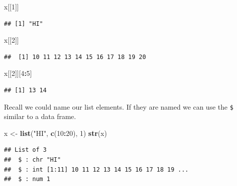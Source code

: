 \documentclass[
]{book}
\newenvironment{Shaded}{\begin{snugshade}}{\end{snugshade}}
\newcommand{\DataTypeTok}[1]{\textcolor[rgb]{0.13,0.29,0.53}{#1}}
\newcommand{\DecValTok}[1]{\textcolor[rgb]{0.00,0.00,0.81}{#1}}
\newcommand{\KeywordTok}[1]{\textcolor[rgb]{0.13,0.29,0.53}{\textbf{#1}}}
\newcommand{\NormalTok}[1]{#1}
\newcommand{\OperatorTok}[1]{\textcolor[rgb]{0.81,0.36,0.00}{\textbf{#1}}}
\newcommand{\StringTok}[1]{\textcolor[rgb]{0.31,0.60,0.02}{#1}}
\theoremstyle{definition}
\theoremstyle{definition}
\theoremstyle{definition}
\theoremstyle{remark}
\begin{document}
\begin{Shaded}
\begin{Highlighting}[]
\NormalTok{x[[}\DecValTok{1}\NormalTok{]]}
\end{Highlighting}
\end{Shaded}

\begin{verbatim}
## [1] "HI"
\end{verbatim}

\begin{Shaded}
\begin{Highlighting}[]
\NormalTok{x[[}\DecValTok{2}\NormalTok{]]}
\end{Highlighting}
\end{Shaded}

\begin{verbatim}
##  [1] 10 11 12 13 14 15 16 17 18 19 20
\end{verbatim}

\begin{Shaded}
\begin{Highlighting}[]
\NormalTok{x[[}\DecValTok{2}\NormalTok{]][}\DecValTok{4}\OperatorTok{:}\DecValTok{5}\NormalTok{]}
\end{Highlighting}
\end{Shaded}

\begin{verbatim}
## [1] 13 14
\end{verbatim}

Recall we could name our list elements. If they are named we can use the \texttt{\$} similar to a data frame.

\begin{Shaded}
\begin{Highlighting}[]
\NormalTok{x <-}\StringTok{ }\KeywordTok{list}\NormalTok{(}\StringTok{"HI"}\NormalTok{, }\KeywordTok{c}\NormalTok{(}\DecValTok{10}\OperatorTok{:}\DecValTok{20}\NormalTok{), }\DecValTok{1}\NormalTok{)}
\KeywordTok{str}\NormalTok{(x)}
\end{Highlighting}
\end{Shaded}

\begin{verbatim}
## List of 3
##  $ : chr "HI"
##  $ : int [1:11] 10 11 12 13 14 15 16 17 18 19 ...
##  $ : num 1
\end{verbatim}

\begin{Shaded}
\end{Shaded}
\end{document}
